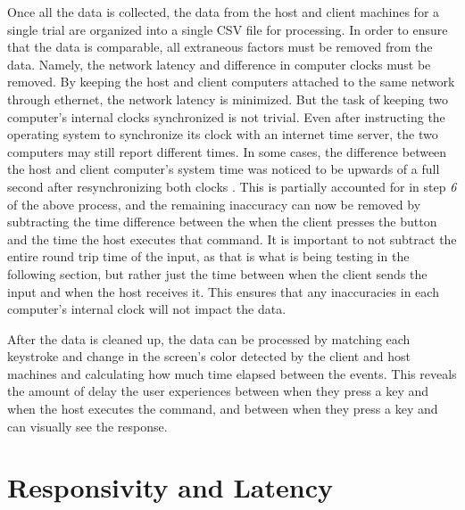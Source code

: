 \noindent
Once all the data is collected, the data from the host and client machines for a single trial are organized into a single CSV file for processing.
In order to ensure that the data is comparable, all extraneous factors must be removed from the data.
Namely, the network latency and difference in computer clocks must be removed.
By keeping the host and client computers attached to the same network through ethernet, the network latency is minimized.
But the task of keeping two computer's internal clocks synchronized is not trivial.
Even after instructing the operating system to synchronize its clock with an internet time server, the two computers may still report different times.
In some cases, the difference between the host and client computer's system time was noticed to be upwards of a full second after resynchronizing both clocks \cite{time.is}.
This is partially accounted for in step \emph{6} of the above process, and the remaining inaccuracy can now be removed by subtracting the time difference between the when the client presses the button and the time the host executes that command.
It is important to not subtract the entire round trip time of the input, as that is what is being testing in the following section, but rather just the time between when the client sends the input and when the host receives it.
This ensures that any inaccuracies in each computer's internal clock will not impact the data.

After the data is cleaned up, the data can be processed by matching each keystroke and change in the screen's color detected by the client and host machines and calculating how much time elapsed between the events.
This reveals the amount of delay the user experiences between when they press a key and when the host executes the command, and between when they press a key and can visually see the response.


\section{Responsivity and Latency}\label{sec:ResponsivityAndLatency}


